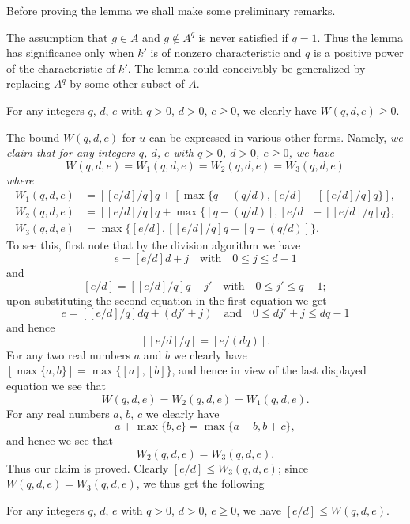 Before proving the lemma we shall make some preliminary remarks.

\begin{remark}\label{art01-rem1}
The assumption that $g\in A$ and $g\not\in A^{q}$ is never satisfied if $q=1$. Thus the lemma has significance only when $k'$ is of nonzero characteristic and $q$ is a positive power of the characteristic of $k'$. The lemma could conceivably be generalized by replacing $A^{q}$ by some other subset of $A$.
\end{remark}

\begin{remark}\label{art01-rem2}
For any integers $q$, $d$, $e$ with $q>0$, $d>0$, $e\geq 0$, we clearly have $W(q,d,e)\geq 0$.
\end{remark}

\begin{remark}\label{art01-rem3}
The bound $W(q,d,e)$ for $u$ can be expressed in various other forms. Namely, {\em we claim that for any integers $q$, $d$, $e$ with $q>0$, $d>0$, $e\geq 0$, we have}
$$
W(q,d,e)=W_{1}(q,d,e)=W_{2}(q,d,e)=W_{3}(q,d,e)
$$
{\em where}
\begin{align*}
W_{1}(q,d,e) &= [[e/d]/q]q+[\max\{q-(q/d),[e/d]-[[e/d]/q]q\}],\\
W_{2}(q,d,e) &= [[e/d]/q]q+\max \{[q-(q/d)],[e/d]-[[e/d]/q]q\},\\
W_{3}(q,d,e) &= \max \{[e/d],[[e/d]/q]q+[q-(q/d)]\}.
\end{align*}
To see this, first note that by the division algorithm we have
$$
e=[e/d]d+j\text{~~ with~~ } 0\leq j\leq d-1
$$
and
$$
[e/d]=[[e/d]/q]q+j'\text{~~ with~~ } 0\leq j'\leq q-1;
$$
upon substituting the second equation in the first equation we get 
$$
e=[[e/d]/q]dq+(dj'+j)\text{~~ and~~ } 0\leq dj'+j\leq dq-1
$$
and hence
$$
[[e/d]/q]=[e/(dq)].
$$\pageoriginale
For any two real numbers $a$ and $b$ we clearly have $[\max \{a,b\}]=\max \{[a],[b]\}$, and hence in view of the last displayed equation we see that
$$
W(q,d,e)=W_{2}(q,d,e)=W_{1}(q,d,e).
$$
For any real numbers $a$, $b$, $c$ we clearly have
$$
a+\max \{b,c\}=\max \{a+b,b+c\},
$$
and hence we see that
$$
W_{2}(q,d,e)=W_{3}(q,d,e).
$$
Thus our claim is proved. Clearly $[e/d]\leq W_{3}(q,d,e)$; since $W(q,d,e)=W_{3}(q,d,e)$, we thus get the following
\end{remark}

\begin{remark}\label{art01-rem4}
For any integers $q$, $d$, $e$ with $q>0$, $d>0$, $e\geq 0$, we have $[e/d]\leq W(q,d,e)$.
\end{remark}

